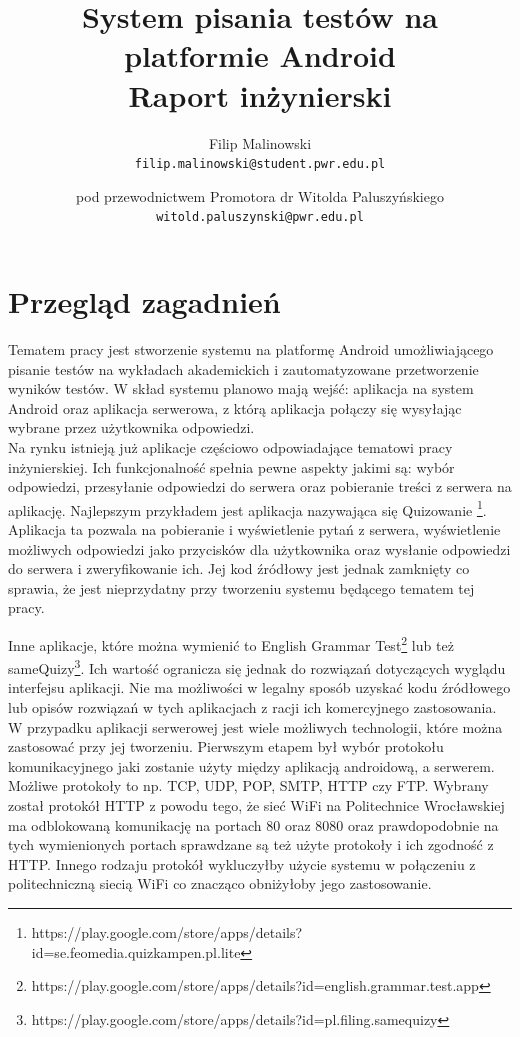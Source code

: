 \documentclass{report}
\title{%
	System pisania testów na platformie Android \\
	\large Raport inżynierski}
\author{
	Filip Malinowski\\
	\texttt{filip.malinowski@student.pwr.edu.pl}
	\and
	pod przewodnictwem Promotora dr Witolda Paluszyńskiego\\
	\texttt{witold.paluszynski@pwr.edu.pl}
}
\date{}
\begin{document}

	\chapter{Przegląd zagadnień}

	Tematem pracy jest stworzenie systemu na platformę Android umożliwiającego pisanie testów na wykładach akademickich i zautomatyzowane przetworzenie wyników testów. W skład systemu planowo mają wejść: aplikacja na system Android oraz aplikacja serwerowa, z którą aplikacja połączy się wysyłając wybrane przez użytkownika odpowiedzi.\\
	
	Na rynku istnieją już aplikacje częściowo odpowiadające tematowi pracy inżynierskiej. Ich funkcjonalność spełnia pewne aspekty jakimi są: wybór odpowiedzi, przesyłanie odpowiedzi do serwera oraz pobieranie treści z serwera na aplikację. Najlepszym przykładem jest aplikacja nazywająca się Quizowanie \footnote{https://play.google.com/store/apps/details?id=se.feomedia.quizkampen.pl.lite}. Aplikacja ta pozwala na pobieranie i wyświetlenie pytań z serwera, wyświetlenie możliwych odpowiedzi jako przycisków dla użytkownika oraz wysłanie odpowiedzi do serwera i zweryfikowanie ich. Jej kod źródłowy jest jednak zamknięty co sprawia, że jest nieprzydatny przy tworzeniu systemu będącego tematem tej pracy.
	
	Inne aplikacje, które można wymienić to English Grammar Test\footnote{https://play.google.com/store/apps/details?id=english.grammar.test.app} lub też sameQuizy\footnote{https://play.google.com/store/apps/details?id=pl.filing.samequizy}. Ich wartość ogranicza się jednak do rozwiązań dotyczących wyglądu interfejsu aplikacji. Nie ma możliwości w legalny sposób uzyskać kodu źródłowego lub opisów rozwiązań w tych aplikacjach z racji ich komercyjnego zastosowania.
	\\
	W przypadku aplikacji serwerowej jest wiele możliwych technologii, które można zastosować przy jej tworzeniu. Pierwszym etapem był wybór protokołu komunikacyjnego jaki zostanie użyty między aplikacją androidową, a serwerem. Możliwe protokoły to np. TCP, UDP, POP, SMTP, HTTP czy FTP. Wybrany został protokół HTTP z powodu tego, że sieć WiFi na Politechnice Wrocławskiej ma odblokowaną komunikację na portach 80 oraz 8080 oraz prawdopodobnie na tych wymienionych portach sprawdzane są też użyte protokoły i ich zgodność z HTTP. Innego rodzaju protokół wykluczyłby użycie systemu w połączeniu z politechniczną siecią WiFi co znacząco obniżyłoby jego zastosowanie.
	
\end{document}
